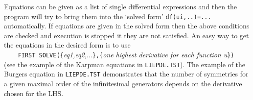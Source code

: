 \documentclass[12pt]{article}
\begin{document}
Equations can be given as a list of single differential expressions and then
the program will try to bring them into the `solved form' {\tt df(ui,..)=...}
automatically. If equations are given in the solved form then the above
conditions are checked and execution is stopped it they are not satisfied.
An easy way to get the equations in the desired form is to use \\
\verb+    FIRST SOLVE({+{\it eq1,eq2,}...\verb+},{+{\it one highest
derivative for each function u}\verb+})+  \\
(see the example of the Karpman equations in {\tt LIEPDE.TST}). 
The example of the Burgers equation in {\tt LIEPDE.TST} demonstrates 
that the number of symmetries for a given maximal order of the infinitesimal
generators depends on the derivative chosen for the LHS.
\end{document}
